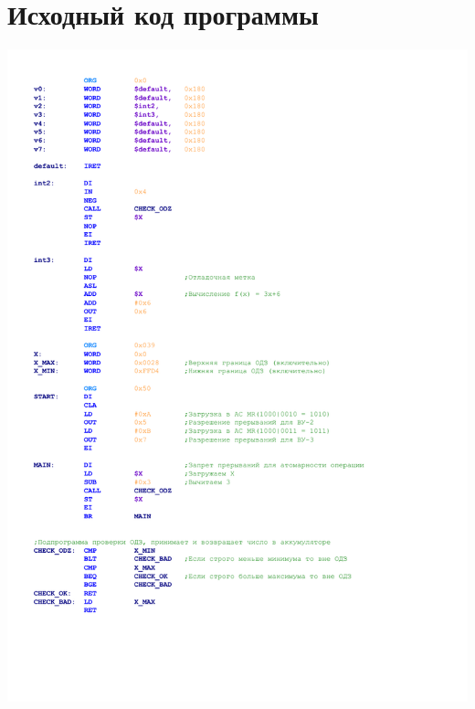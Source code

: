 \documentclass[12pt]{article}
\begin{document}
	\section{Исходный код программы}
	\includegraphics[width=0.9\linewidth]{colored_code.pdf}
	\newpage
	
\end{document}
